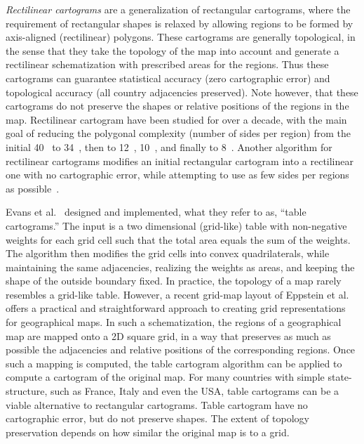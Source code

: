 \documentclass{egpubl}
\begin{document}
\textit{Rectilinear cartograms} are a generalization of rectangular cartograms, where the requirement of rectangular shapes is relaxed by allowing regions to be formed by axis-aligned (rectilinear) polygons. These cartograms are generally topological, in the sense that they take the topology of the map into account and generate a rectilinear schematization with prescribed areas for the regions. Thus these cartograms can guarantee statistical accuracy (zero cartographic error) and  topological accuracy (all country adjacencies preserved). Note however, that these cartograms do not preserve the shapes or relative positions of the regions in the map. Rectilinear cartogram have been studied for over a decade, with the main goal of reducing the polygonal complexity (number of sides per region) from the initial 40~\cite{deBerg07} to 34~\cite{Nagamochi}, then to 12~\cite{ElenaTR}, 10~\cite{ourISAAC}, and finally to 8~\cite{ourSoCG}. Another algorithm for rectilinear cartograms modifies an initial rectangular cartogram into a rectilinear one with no cartographic error, while attempting to use as few sides per regions as possible~\cite{BMS10}.






Evans et al.~\cite{EFKKMNV13} designed and implemented, what they refer to as, ``table cartograms.'' The input is a two dimensional (grid-like) table with non-negative weights for each grid cell such that the total area equals the sum of the weights. The algorithm then modifies the grid cells into convex quadrilaterals, while maintaining the same adjacencies, realizing the weights as areas, and keeping the shape of the outside boundary fixed. In practice, the topology of a map rarely resembles a grid-like table. However, a recent grid-map layout of Eppstein et al.~\cite{EKSS15_j} offers a practical and straightforward approach to creating grid representations for geographical maps. In such a schematization, the regions of a geographical map are mapped onto a 2D square grid, in a way that preserves as much as possible the adjacencies and relative positions of the corresponding regions. Once such a mapping is computed, the table cartogram algorithm can be applied to compute a cartogram of the original map. For many countries with simple state-structure, such as France, Italy and even the USA, table cartograms can be a viable alternative to rectangular cartograms.
Table cartogram have no cartographic error, but do not preserve shapes. The extent of topology preservation depends on how similar the original map is to a grid. 
\end{document}
